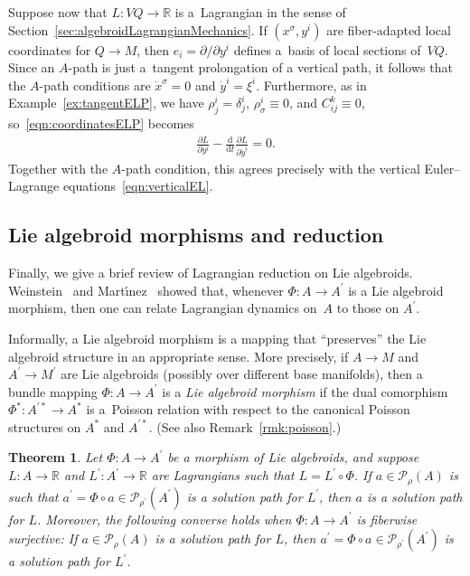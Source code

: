 \documentclass[pdftex]{sigma}
\numberwithin{equation}{section}
\newtheorem{Theorem}{Theorem}[section]
\begin{document}
Suppose now that $ L \colon V Q \rightarrow \mathbb{R} $ is a~Lagrangian in the sense of Section~\ref{sec:algebroidLagrangianMechanics}. If $ ( x ^\sigma , y ^i ) $ are f\/iber-adapted local coordinates for $Q \rightarrow M $, then $ e _i = \partial / \partial y ^i $ def\/ines a~basis of local sections of~$ V Q $. Since an $A$-path is just a~tangent prolongation of a vertical path, it follows that the $A$-path conditions are $ \dot{x} ^\sigma = 0 $ and $ \dot{y} ^i = \xi ^i $. Furthermore, as in Example~\ref{ex:tangentELP}, we have $ \rho ^i _j = \delta ^i _j $, $ \rho ^i _\sigma \equiv 0 $, and $ C _{ i j } ^k \equiv 0 $, so~\eqref{eqn:coordinatesELP} becomes
\begin{gather*}
 \frac{ \partial L }{ \partial y ^i } - \frac{\mathrm{d}}{\mathrm{d}t} \frac{ \partial L }{ \partial \dot{y} ^i } = 0 .
\end{gather*}
Together with the $A$-path condition, this agrees precisely with the vertical Euler--Lagrange equations~\eqref{eqn:verticalEL}.

\subsection{Lie algebroid morphisms and reduction}

Finally, we give a brief review of Lagrangian reduction on Lie algebroids. Weinstein~\cite{Weinstein1996} and Mart\'{\i}nez~\cite{Martinez2008} showed that, whenever $ \Phi \colon A \rightarrow A ^\prime $ is a Lie algebroid morphism, then one can relate Lagrangian dynamics on~$A$ to those on $ A ^\prime $.

Informally, a Lie algebroid morphism is a mapping that ``preserves'' the Lie algebroid structure in an appropriate sense. More precisely, if $ A \rightarrow M $ and $ A ^\prime \rightarrow M ^\prime $ are Lie algebroids (possibly over dif\/ferent base manifolds), then a bundle mapping $ \Phi \colon A \rightarrow A ^\prime $ is a \emph{Lie algebroid morphism} if the dual comorphism $ \Phi ^\ast \colon A ^{\prime \ast} \rightarrow A ^\ast $ is a~Poisson relation with respect to the canonical Poisson structures on $ A ^\ast $ and $ A ^{\prime \ast} $. (See also
Remark~\ref{rmk:poisson}.)

\begin{Theorem} \label{thm:weinsteinMartinez} Let $ \Phi \colon A \rightarrow A ^\prime $ be a morphism of Lie algebroids, and suppose $ L \colon A \rightarrow \mathbb{R} $ and $ L ^\prime \colon A ^\prime \rightarrow \mathbb{R} $ are Lagrangians such that $ L = L ^\prime \circ \Phi $. If $ a \in \mathcal{P} _\rho (A) $ is such that $ a ^\prime = \Phi \circ a \in \mathcal{P} _{ \rho ^\prime } ( A ^\prime ) $ is a solution path for $ L ^\prime $, then $a$ is a solution path
 for $L$. Moreover, the following converse holds when $ \Phi \colon A \rightarrow A ^\prime $ is fiberwise surjective: If $ a \in \mathcal{P} _\rho (A) $ is a solution path for $L$, then $ a ^\prime = \Phi \circ a \in \mathcal{P} _{ \rho ^\prime } ( A ^\prime ) $ is a solution path for $ L ^\prime $.
\end{Theorem}
\end{document}
